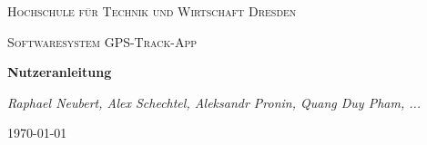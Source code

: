 \documentclass{article}
\begin{document}
\begin{titlepage}
    \centering
    {\scshape\LARGE Hochschule für Technik und Wirtschaft Dresden \par}
    \vspace{1cm}
    {\scshape\Large Softwaresystem \glqq GPS-Track-App\grqq\par}
    \vspace{1.5cm}
    {\huge\bfseries Nutzeranleitung\par}
    \vspace{2cm}
    {\Large\itshape Raphael Neubert, Alex Schechtel, Aleksandr Pronin, Quang Duy Pham, ... \par}
    \vfill

    {\large \today\par}
\end{titlepage}

\tableofcontents

\newpage
\end{document}

